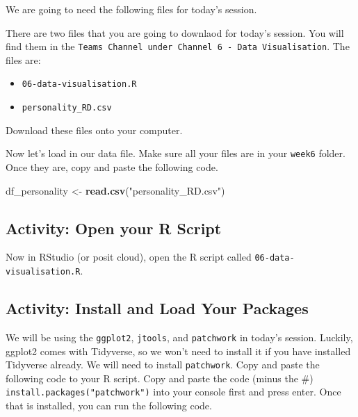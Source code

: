 \documentclass[
]{book}
\newenvironment{Shaded}{\begin{snugshade}}{\end{snugshade}}
\newcommand{\FunctionTok}[1]{\textcolor[rgb]{0.13,0.29,0.53}{\textbf{#1}}}
\newcommand{\NormalTok}[1]{#1}
\newcommand{\OtherTok}[1]{\textcolor[rgb]{0.56,0.35,0.01}{#1}}
\newcommand{\StringTok}[1]{\textcolor[rgb]{0.31,0.60,0.02}{#1}}
\providecommand{\tightlist}{%
  \setlength{\itemsep}{0pt}\setlength{\parskip}{0pt}}
\begin{document}
We are going to need the following files for today's session.

There are two files that you are going to downlaod for today's session. You will find them in the \texttt{Teams\ Channel\ under\ Channel\ 6\ -\ Data\ Visualisation}. The files are:

\begin{itemize}
\tightlist
\item
  \texttt{06-data-visualisation.R}
\item
  \texttt{personality\_RD.csv}
\end{itemize}

Download these files onto your computer.

Now let's load in our data file. Make sure all your files are in your \texttt{week6} folder. Once they are, copy and paste the following code.

\begin{Shaded}
\begin{Highlighting}[]
\NormalTok{df\_personality }\OtherTok{\textless{}{-}} \FunctionTok{read.csv}\NormalTok{(}\StringTok{"personality\_RD.csv"}\NormalTok{)}
\end{Highlighting}
\end{Shaded}

\hypertarget{activity-open-your-r-script}{%
\subsection{Activity: Open your R Script}\label{activity-open-your-r-script}}

Now in RStudio (or posit cloud), open the R script called \texttt{06-data-visualisation.R}.

\hypertarget{activity-install-and-load-your-packages}{%
\subsection{Activity: Install and Load Your Packages}\label{activity-install-and-load-your-packages}}

We will be using the \texttt{ggplot2}, \texttt{jtools}, and \texttt{patchwork} in today's session. Luckily, ggplot2 comes with Tidyverse, so we won't need to install it if you have installed Tidyverse already. We will need to install \texttt{patchwork}. Copy and paste the following code to your R script. Copy and paste the code (minus the \#) \texttt{install.packages("patchwork")} into your console first and press enter. Once that is installed, you can run the following code.
\end{document}
